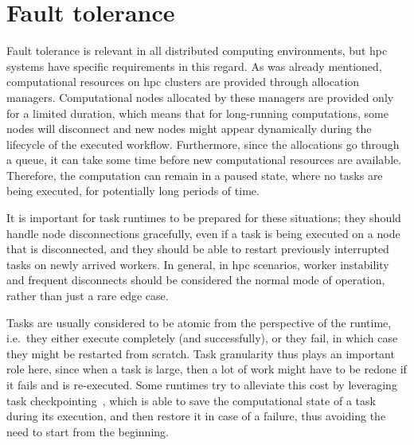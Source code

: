 \section{Fault tolerance}
Fault tolerance is relevant in all distributed computing environments, but \gls{hpc}
systems have specific requirements in this regard. As was already mentioned, computational
resources on \gls{hpc} clusters are provided through allocation managers.
Computational nodes allocated by these managers are provided only for a limited duration, which
means that for long-running computations, some nodes will disconnect and new nodes might appear
dynamically during the lifecycle of the executed workflow. Furthermore, since the allocations go
through a queue, it can take some time before new computational resources are available. Therefore,
the computation can remain in a paused state, where no tasks are being executed, for potentially
long periods of time.

It is important for task runtimes to be prepared for these situations; they should handle node
disconnections gracefully, even if a task is being executed on a node that is disconnected, and
they should be able to restart previously interrupted tasks on newly arrived workers. In general,
in \gls{hpc} scenarios, worker instability and frequent disconnects should be
considered the normal mode of operation, rather than just a rare edge case.

Tasks are usually considered to be atomic from the perspective of the runtime, i.e.\ they either
execute completely (and successfully), or they fail, in which case they might be restarted from
scratch. Task granularity thus plays an important role here, since when a task is large, then a lot
of work might have to be redone if it fails and is re-executed. Some runtimes try to alleviate this
cost by leveraging task checkpointing~\cite{task_checkpointing}, which is able to save the
computational state of a task during its execution, and then restore it in case of a failure, thus
avoiding the need to start from the beginning.


